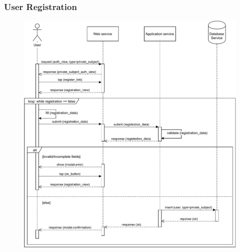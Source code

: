 \documentclass[12pt,a4paper]{article}
\begin{document}
\subsubsection{User Registration}
	\begin{figure}[H]
				\centering
				\includegraphics[width=1\textwidth,height=0.9\textheight,keepaspectratio]{../assets/sequence_diagrams/exports/registration_private_subject.pdf}
				\label{fig:registration_sequence}
			\end{figure}
\end{document}
